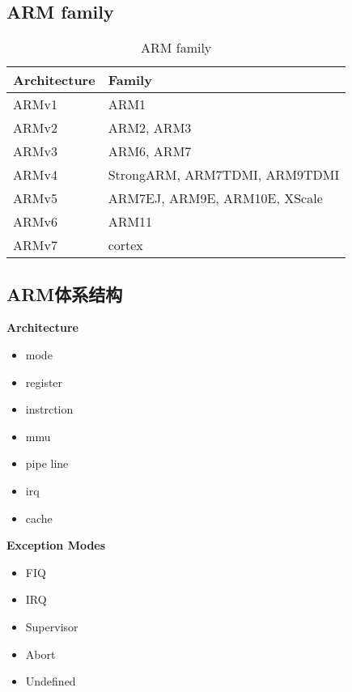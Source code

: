 \subsection{ARM family}
\begin{table}[htbp]
\label{tab:arm family}
\centering 
\begin{tabular}{|l|l|}
\hline
Architecture & Family \\\hline
ARMv1 & ARM1 \\\hline
ARMv2 & ARM2, ARM3 \\\hline
ARMv3 & ARM6, ARM7 \\\hline
ARMv4 & StrongARM, ARM7TDMI, ARM9TDMI \\\hline
ARMv5 & ARM7EJ, ARM9E, ARM10E, XScale \\\hline
ARMv6 & ARM11 \\\hline
ARMv7 & cortex \\\hline
\end{tabular}
\caption{ARM family}
\end{table}

\subsection{ARM体系结构}
\textbf{Architecture}
\begin{itemize}
	\item mode
	\item register
	\item instrction
	\item mmu
	\item pipe line
	\item irq
	\item cache
\end{itemize}

\textbf{Exception Modes}
\begin{itemize}
	\item FIQ
	\item IRQ
	\item Supervisor
	\item Abort
	\item Undefined
\end{itemize}


